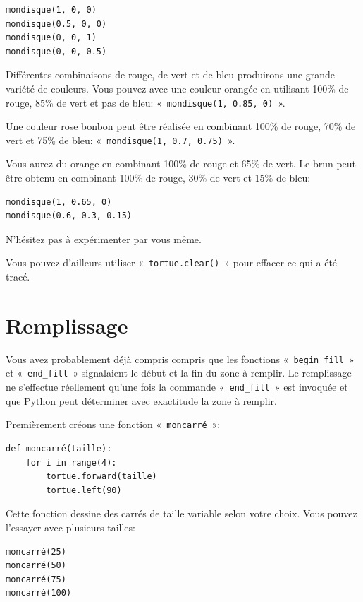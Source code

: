 \begin{Verbatim}[frame=single,rulecolor=\color{mbleu}, label=à taper]
mondisque(1, 0, 0)
mondisque(0.5, 0, 0)
mondisque(0, 0, 1)
mondisque(0, 0, 0.5)
\end{Verbatim}

Différentes combinaisons de rouge, de vert et de bleu produirons une grande variété de couleurs.
Vous pouvez avec une couleur orangée en utilisant 100\% de rouge, 85\% de vert et pas de bleu: « \texttt{mondisque(1, 0.85, 0)} ».

Une couleur rose bonbon peut être réalisée en combinant 100\% de rouge, 70\% de vert et 75\% de bleu: « \texttt{mondisque(1, 0.7, 0.75)} ». 

Vous aurez du orange en combinant 100\% de rouge et 65\% de vert. Le brun peut être obtenu en combinant 100\% de rouge, 30\% de vert et 15\% de bleu:
\begin{Verbatim}[frame=single,rulecolor=\color{mbleu}, label=à taper]
mondisque(1, 0.65, 0)
mondisque(0.6, 0.3, 0.15)
\end{Verbatim}

N'hésitez pas à expérimenter par vous même. 

Vous pouvez d'ailleurs utiliser « \texttt{tortue.clear()} » pour effacer ce qui a été tracé.


\section{Remplissage}
Vous avez probablement déjà compris compris que les fonctions « \texttt{begin\_fill} » et « \texttt{end\_fill} » signalaient le début et la fin du zone à remplir. Le remplissage ne s'effectue réellement qu'une fois la commande « \texttt{end\_fill} » est invoquée et que Python peut déterminer avec exactitude la zone à remplir.

Premièrement créons une fonction « \texttt{moncarré} »:
\begin{Verbatim}[frame=single,rulecolor=\color{mbleu}, label=à taper]
def moncarré(taille):
    for i in range(4):
        tortue.forward(taille)
        tortue.left(90)
\end{Verbatim}

Cette fonction dessine des carrés de taille variable selon votre choix.
Vous pouvez l'essayer avec plusieurs tailles:
\begin{Verbatim}[frame=single,rulecolor=\color{mbleu}, label=à taper]
moncarré(25)
moncarré(50)
moncarré(75)
moncarré(100)
\end{Verbatim}


